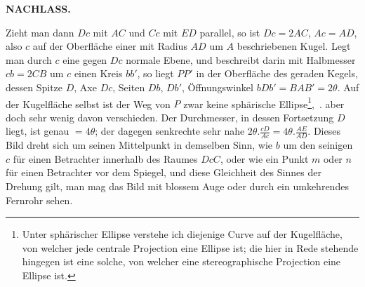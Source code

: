 \clearpage
\noindent{}\hfill{\small\textbf{NACHLASS.}}\hfill\null\par
\begin{center}
\end{center}
Zieht man dann $Dc$ mit $AC$ und $Cc$ mit $ED$ parallel, so ist $Dc=2AC$,
$Ac=AD$, also $c$ auf der Oberfläche einer mit Radius $AD$ um $A$ beschriebenen
Kugel. Legt man durch $c$ eine gegen $Dc$ normale Ebene, und beschreibt
darin mit Halbmesser $cb=2CB$ um $c$ einen Kreis $bb'$, so liegt
$PP'$ in der Oberfläche des geraden Kegels, dessen Spitze $D$, Axe $Dc$, Seiten
$Db$, $Db'$, Öffnungswinkel $bDb'=BAB'=2\theta$. Auf der Kugelfläche selbst ist
der Weg von $P$ zwar keine sphärische Ellipse\begingroup\renewcommand{\thefootnote}{*)}\footnote{Unter sphärischer Ellipse verstehe ich diejenige Curve auf der Kugelfläche, von welcher jede centrale Projection eine Ellipse ist; die hier in Rede stehende hingegen ist eine solche, von welcher eine stereographische Projection eine Ellipse ist.}\endgroup,\ .
aber doch sehr wenig davon verschieden. Der Durchmesser, in dessen Fortsetzung $D$ liegt, ist genau $=4\theta$;
der dagegen senkrechte sehr nahe $2\theta.\frac{cD}{Ac}=4\theta.\frac{AE}{AD}$.
Dieses Bild dreht sich um seinen Mittelpunkt in demselben Sinn, wie $b$ um den seinigen $c$ für
einen Betrachter innerhalb des Raumes $DcC$, oder wie ein Punkt $m$ oder $n$
für einen Betrachter vor dem Spiegel, und diese Gleichheit des Sinnes der
Drehung gilt, man mag das Bild mit blossem Auge oder durch ein umkehrendes
Fernrohr sehen.

